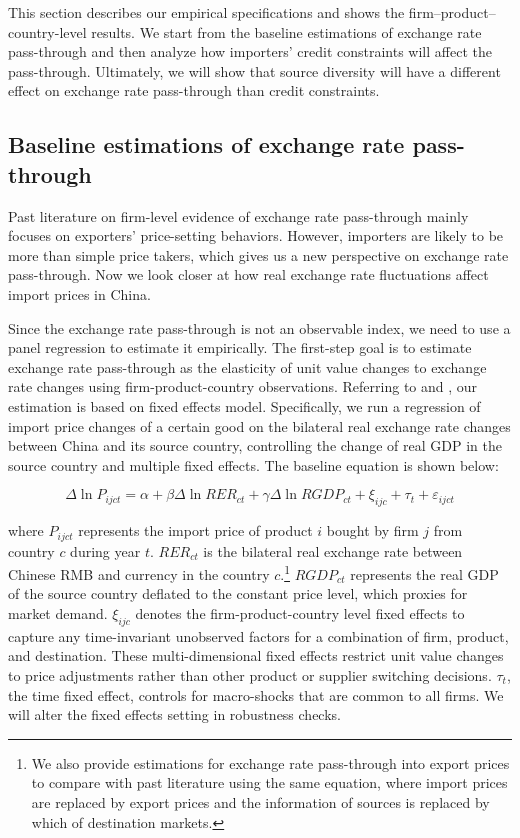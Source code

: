 \documentclass[12pt]{article}
\begin{document}
This section describes our empirical specifications and shows the firm–product–country-level results. We start from the baseline estimations of exchange rate pass-through and then analyze how importers' credit constraints will affect the pass-through. Ultimately, we will show that source diversity will have a different effect on exchange rate pass-through than credit constraints.

\subsection{Baseline estimations of exchange rate pass-through} \label{Empirical-Baseline}

Past literature on firm-level evidence of exchange rate pass-through mainly focuses on exporters' price-setting behaviors. However, importers are likely to be more than simple price takers, which gives us a new perspective on exchange rate pass-through. Now we look closer at how real exchange rate fluctuations affect import prices in China.

Since the exchange rate pass-through is not an observable index, we need to use a panel regression to estimate it empirically. The first-step goal is to estimate exchange rate pass-through as the elasticity of unit value changes to exchange rate changes using firm-product-country observations. Referring to \cite{aik2014} and \cite{lmx2015}, our estimation is based on fixed effects model. Specifically, we run a regression of import price changes of a certain good on the bilateral real exchange rate changes between China and its source country, controlling the change of real GDP in the source country and multiple fixed effects. The baseline equation is shown below:

\begin{equation}
	\Delta \ln P_{i j c t}=\alpha+\beta \Delta \ln R E R_{c t}+\gamma \Delta \ln R G D P_{c t}+\xi_{i j c}+\tau_{t}+\varepsilon_{i j c t}
	\label{eq.baseline}
\end{equation}

where $P_{ijct}$ represents the import price of product $i$ bought by firm $j$ from country $c$ during year $t$. $R E R_{c t}$ is the bilateral real exchange rate between Chinese RMB and currency in the country $c$.\footnote{We also provide estimations for exchange rate pass-through into export prices to compare with past literature using the same equation, where import prices are replaced by export prices and the information of sources is replaced by which of destination markets.} $RGDP_{ct}$ represents the real GDP of the source country deflated to the constant price level, which proxies for market demand. $\xi_{ijc}$ denotes the firm-product-country level fixed effects to capture any time-invariant unobserved factors for a combination of firm, product, and destination. These multi-dimensional fixed effects restrict unit value changes to price adjustments rather than other product or supplier switching decisions. $\tau_t$, the time fixed effect, controls for macro-shocks that are common to all firms. We will alter the fixed effects setting in robustness checks.
\end{document}
